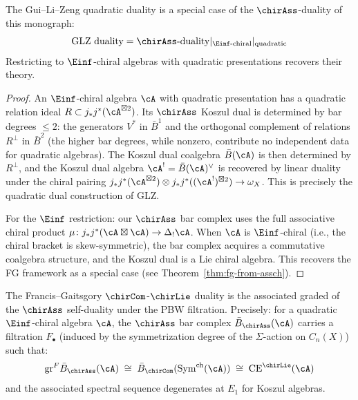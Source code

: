 \begin{proposition}\label{prop:glz-special-case}
The Gui--Li--Zeng quadratic duality is a special case of the $\chirAss$-duality of this monograph:
\[
\text{GLZ duality} = \chirAss\text{-duality} |_{\Einf\text{-chiral}} |_{\text{quadratic}}
\]
Restricting to $\Einf$-chiral algebras with quadratic presentations recovers their theory.
\end{proposition}

\begin{proof}
An $\Einf$-chiral algebra $\cA$ with quadratic presentation has a quadratic relation ideal $R \subset j_*j^*(\cA^{\boxtimes 2})$.  Its $\chirAss$ Koszul dual is determined by bar degrees $\leq 2$: the generators $V^*$ in $\bar{B}^1$ and the orthogonal complement of relations $R^\perp$ in $\bar{B}^2$ (the higher bar degrees, while nonzero, contribute no independent data for quadratic algebras).  The Koszul dual coalgebra $\bar{B}(\cA)$ is then determined by $R^\perp$, and the Koszul dual algebra $\cA^! = \bar{B}(\cA)^\vee$ is recovered by linear duality under the chiral pairing $j_*j^*(\cA^{\boxtimes 2}) \otimes j_*j^*((\cA^!)^{\boxtimes 2}) \to \omega_X$.  This is precisely the quadratic dual construction of GLZ.

For the $\Einf$ restriction: our $\chirAss$ bar complex uses the full associative chiral product $\mu\colon j_*j^*(\cA \boxtimes \cA) \to \Delta_!\cA$.  When $\cA$ is $\Einf$-chiral (i.e., the chiral bracket is skew-symmetric), the bar complex acquires a commutative coalgebra structure, and the Koszul dual is a Lie chiral algebra.  This recovers the FG framework as a special case (see Theorem~\ref{thm:fg-from-assch}).
\end{proof}

\begin{theorem}\label{thm:fg-from-assch}
The Francis--Gaitsgory $\chirCom$-$\chirLie$ duality is the associated graded of the $\chirAss$ self-duality under the PBW filtration.  Precisely: for a quadratic $\Einf$-chiral algebra $\cA$, the $\chirAss$ bar complex $\bar{B}_{\chirAss}(\cA)$ carries a filtration $F_\bullet$ (induced by the symmetrization degree of the $\Sigma$-action on $C_n(X)$) such that:
\begin{equation}\label{eq:fg-from-assch}
\mathrm{gr}^F \bar{B}_{\chirAss}(\cA) \;\cong\; \bar{B}_{\chirCom}(\mathrm{Sym}^{\mathrm{ch}}(\cA)) \;\cong\; \mathrm{CE}^{\chirLie}(\cA)
\end{equation}
and the associated spectral sequence degenerates at $E_1$ for Koszul algebras.
\end{theorem}


